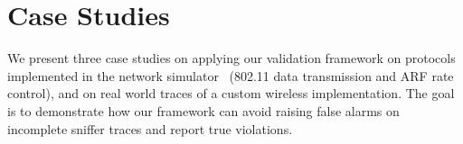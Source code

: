 \section{Case Studies}
\label{sec:case}

We present three case studies on applying our validation framework on
protocols implemented in the \ns{} network simulator~\cite{ns3}
(802.11 data transmission and ARF rate control), and on real world
traces of a custom wireless implementation. The goal is to demonstrate
how our framework can avoid raising false alarms on incomplete sniffer
traces and report true violations.





